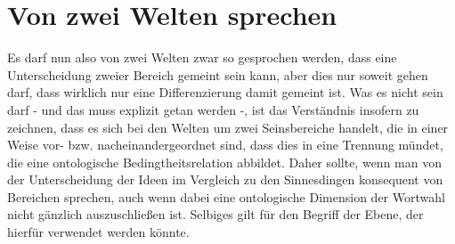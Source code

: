\documentclass[12pt]{article}
\begin{document}
\section{Von zwei Welten sprechen}
Es darf nun also von zwei Welten zwar so gesprochen werden, dass eine Unterscheidung zweier Bereich gemeint sein kann, aber dies nur soweit gehen darf, dass wirklich nur eine Differenzierung damit gemeint ist. Was es nicht sein darf - und das muss explizit getan werden -, ist das Verständnis insofern zu zeichnen, dass es sich bei den Welten um zwei Seinsbereiche handelt, die in einer Weise vor- bzw. nacheinandergeordnet sind, dass dies in eine Trennung mündet, die eine ontologische Bedingtheitsrelation abbildet. Daher sollte, wenn man von der Unterscheidung der Ideen im Vergleich zu den Sinnesdingen konsequent von Bereichen sprechen, auch wenn dabei eine ontologische Dimension der Wortwahl nicht gänzlich auszuschließen ist. Selbiges gilt für den Begriff der Ebene, der hierfür verwendet werden könnte.
\end{document}
